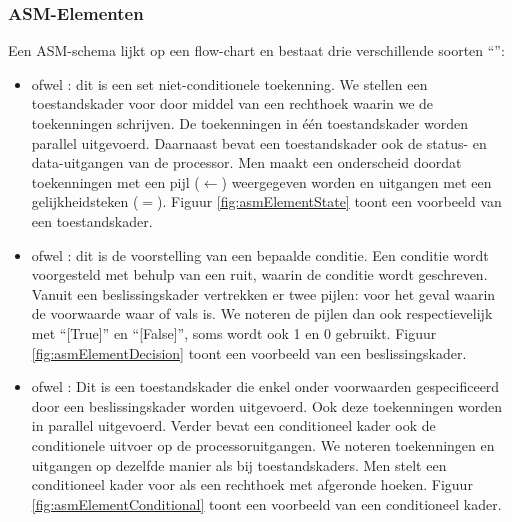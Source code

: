 \subsubsection{ASM-Elementen}
Een ASM-schema lijkt op een flow-chart en bestaat drie verschillende soorten ``'':
\begin{itemize}
 \item {} ofwel : dit is een set niet-conditionele toekenning. We stellen een toestandskader voor door middel van een rechthoek waarin we de toekenningen schrijven. De toekenningen in \'e\'en toestandskader worden parallel uitgevoerd. Daarnaast bevat een toestandskader ook de status- en data-uitgangen van de processor. Men maakt een onderscheid doordat toekenningen met een pijl ($\gets$) weergegeven worden en uitgangen met een gelijkheidsteken ($=$). Figuur \ref{fig:asmElementState} toont een voorbeeld van een toestandskader.
 \item {} ofwel : dit is de voorstelling van een bepaalde conditie. Een conditie wordt voorgesteld met behulp van een ruit, waarin de conditie wordt geschreven. Vanuit een beslissingskader vertrekken er twee pijlen: voor het geval waarin de voorwaarde waar of vals is. We noteren de pijlen dan ook respectievelijk met ``[True]'' en ``[False]'', soms wordt ook 1 en 0 gebruikt. Figuur \ref{fig:asmElementDecision} toont een voorbeeld van een beslissingskader.
 \item {} ofwel : Dit is een toestandskader die enkel onder voorwaarden gespecificeerd door een beslissingskader worden uitgevoerd. Ook deze toekenningen worden in parallel uitgevoerd. Verder bevat een conditioneel kader ook de conditionele uitvoer op de processoruitgangen. We noteren toekenningen en uitgangen op dezelfde manier als bij toestandskaders. Men stelt een conditioneel kader voor als een rechthoek met afgeronde hoeken. Figuur \ref{fig:asmElementConditional} toont een voorbeeld van een conditioneel kader.
\end{itemize}
